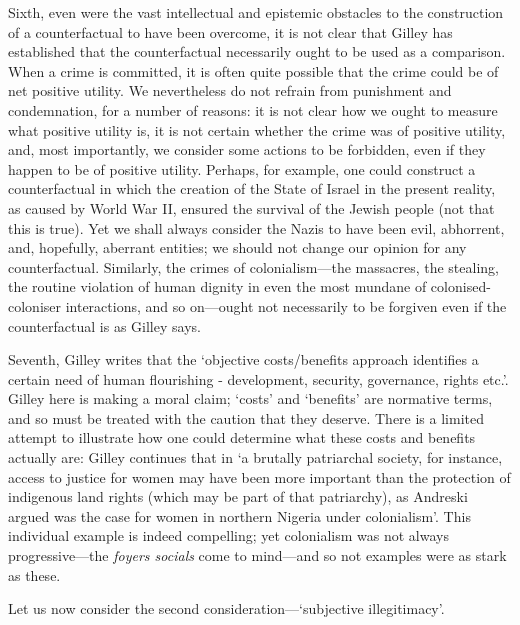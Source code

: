 \begin{multicols}{2}
Sixth, even were the vast intellectual and epistemic obstacles to the construction of a counterfactual to have been overcome, it is not clear that Gilley has established that the counterfactual necessarily ought to be used as a comparison. When a crime is committed, it is often quite possible that the crime could be of net positive utility. We nevertheless do not refrain from punishment and condemnation, for a number of reasons: it is not clear how we ought to measure what positive utility is, it is not certain whether the crime was of positive utility, and, most importantly, we consider some actions to be forbidden, even if they happen to be of positive utility. Perhaps, for example, one could construct a counterfactual in which the creation of the State of Israel in the present reality, as caused by World War II, ensured the survival of the Jewish people (not that this is true). Yet we shall always consider the Nazis to have been evil, abhorrent, and, hopefully, aberrant entities; we should not change our opinion for any counterfactual. Similarly, the crimes of colonialism---the massacres, the stealing, the routine violation of human dignity in even the most mundane of colonised-coloniser interactions, and so on---ought not necessarily to be forgiven even if the counterfactual is as Gilley says.

Seventh, Gilley writes that the `objective costs/benefits approach identifies a certain need of human flourishing - development, security, governance, rights etc.'. Gilley here is making a moral claim; `costs' and `benefits' are normative terms, and so must be treated with the caution that they deserve. There is a limited attempt to illustrate how one could determine what these costs and benefits actually are: Gilley continues that in `a brutally patriarchal society, for instance, access to justice for women may have been more important than the protection of indigenous land rights (which may be part of that patriarchy), as Andreski argued was the case for women in northern Nigeria under colonialism'. This individual example is indeed compelling; yet colonialism was not always progressive---the \textit{foyers socials} come to mind---and so not examples were as stark as these.

Let us now consider the second consideration---`subjective illegitimacy'.


\end{multicols}

